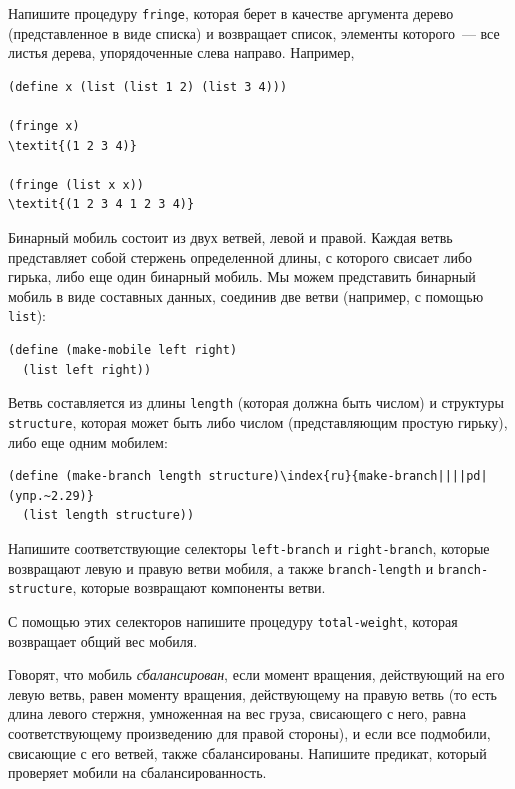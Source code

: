 \begin{exercise}{2.28}\label{EX2.28}%
Напишите процедуру {\tt fringe},
которая берет в
качестве аргумента дерево (представленное в виде списка) и возвращает
список, элементы которого~--- все листья дерева, упорядоченные слева
направо. Например,

\begin{Verbatim}[fontsize=\small]
(define x (list (list 1 2) (list 3 4)))

(fringe x)
\textit{(1 2 3 4)}

(fringe (list x x))
\textit{(1 2 3 4 1 2 3 4)}
\end{Verbatim}
\end{exercise}
\begin{exercise}{2.29}\label{EX2.29}%
Бинарный  
мобиль состоит из двух ветвей, левой и правой.
Каждая ветвь представляет собой стержень определенной длины, с
которого свисает либо гирька, либо еще один бинарный мобиль.  Мы можем 
представить бинарный мобиль в виде составных данных, соединив две
ветви (например, с помощью {\tt list}):

\begin{Verbatim}[fontsize=\small]
(define (make-mobile left right)
  (list left right))
\end{Verbatim}
Ветвь составляется из длины {\tt length} (которая должна быть
числом) и структуры {\tt struc\-ture}, которая может быть либо
числом (представляющим простую гирьку), либо еще одним мобилем:

\begin{Verbatim}[fontsize=\small]
(define (make-branch length structure)\index{ru}{make-branch||||pd|(упр.~2.29)}
  (list length structure))
\end{Verbatim}

\begin{plainenum}
\item
Напишите соответствующие селекторы
  {\tt left-branch} и {\tt right-branch}, которые
  возвращают левую и правую ветви мобиля, а также
  {\tt branch-length} и {\tt branch-struc\-ture}, которые
  возвращают компоненты ветви.

\item
С помощью этих селекторов напишите процедуру
  {\tt total-weight}, которая возвращает общий вес мобиля.

\item
Говорят, что
  мобиль {\em сбалансирован}, если момент вращения, действующий на его
  левую ветвь, равен моменту вращения, действующему на правую ветвь (то
  есть длина левого стержня, умноженная на вес груза, свисающего с
  него, равна соответствующему произведению для правой стороны), и если
  все подмобили, свисающие с его ветвей, также сбалансированы.  Напишите 
  предикат, который проверяет мобили на сбалансированность.


\end{plainenum}
\end{exercise}
